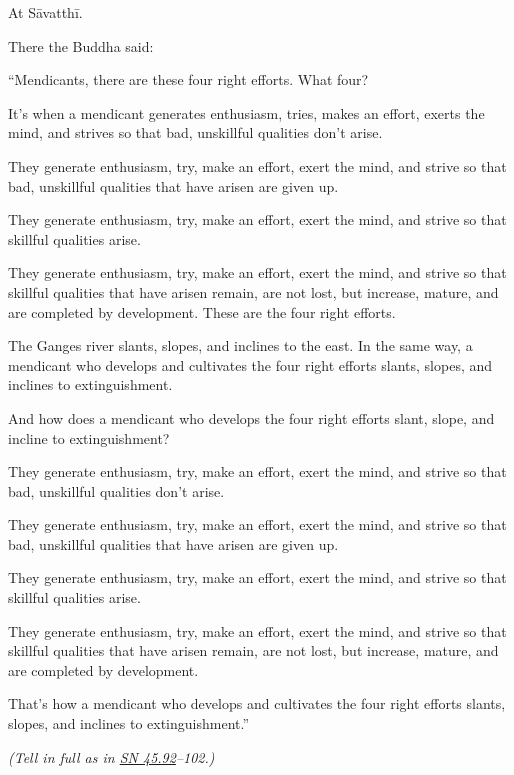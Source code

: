 \documentclass[12pt,openany]{book}%
\newcommand*{\scexpansioninstructions}[1]{\begin{small}\textit{#1}\end{small}}
\begin{document}
At \textsanskrit{Sāvatthī}. 

There the Buddha said: 

“Mendicants, there are these four right efforts. What four? 

It’s when a mendicant generates enthusiasm, tries, makes an effort, exerts the mind, and strives so that bad, unskillful qualities don’t arise. 

They generate enthusiasm, try, make an effort, exert the mind, and strive so that bad, unskillful qualities that have arisen are given up. 

They generate enthusiasm, try, make an effort, exert the mind, and strive so that skillful qualities arise. 

They generate enthusiasm, try, make an effort, exert the mind, and strive so that skillful qualities that have arisen remain, are not lost, but increase, mature, and are completed by development. These are the four right efforts. 

The Ganges river slants, slopes, and inclines to the east. In the same way, a mendicant who develops and cultivates the four right efforts slants, slopes, and inclines to extinguishment. 

And how does a mendicant who develops the four right efforts slant, slope, and incline to extinguishment? 

They generate enthusiasm, try, make an effort, exert the mind, and strive so that bad, unskillful qualities don’t arise. 

They generate enthusiasm, try, make an effort, exert the mind, and strive so that bad, unskillful qualities that have arisen are given up. 

They generate enthusiasm, try, make an effort, exert the mind, and strive so that skillful qualities arise. 

They generate enthusiasm, try, make an effort, exert the mind, and strive so that skillful qualities that have arisen remain, are not lost, but increase, mature, and are completed by development. 

That’s how a mendicant who develops and cultivates the four right efforts slants, slopes, and inclines to extinguishment.” 

\scexpansioninstructions{(Tell in full as in \href{https://suttacentral.net/sn45.92}{SN 45.92}–102.) }
\end{document}
